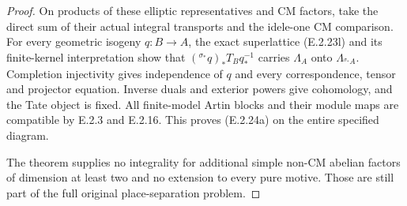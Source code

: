 \begin{proof}
On products of these elliptic representatives and
CM factors, take the direct sum of their actual
integral transports and the idele-one CM comparison.
For every geometric isogeny \(q:B\to A\), the exact
superlattice (E.2.23l) and its finite-kernel
interpretation show that
\(({}^{\sigma_*}q)_*T_Bq_*^{-1}\) carries
\(\Lambda_A\) onto \(\Lambda_{{}^{\sigma_*}A}\).
Completion injectivity gives independence of \(q\)
and every correspondence, tensor and projector
equation. Inverse duals and exterior powers give
cohomology, and the Tate object is fixed.
All finite-model Artin blocks and their module maps
are compatible by E.2.3 and E.2.16. This proves
(E.2.24a) on the entire specified diagram.

The theorem supplies no integrality for additional
simple non-CM abelian factors of dimension at least
two and no extension to every pure motive.
Those are still part of the full original
place-separation problem.
\end{proof}

